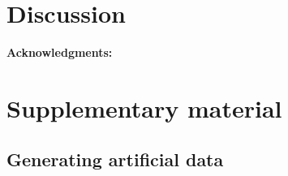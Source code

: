 \documentclass[preprint,amsmath,amssymb,superscriptaddress,showpacs,pre]{revtex4-1}
\begin{document}
\section{Discussion}
\label{sec:discussion}

\textbf{Acknowledgments:} 





\clearpage




\newpage
\appendix
\setcounter{figure}{0}
\renewcommand{\figurename}{Figure S}
\setcounter{table}{0}
\renewcommand{\tablename}{Table S}

\section{Supplementary material} %
\label{sec:supplementary_material}


\subsection{Generating artificial data} %
\label{sub:generating_artificial_data}
\end{document}
